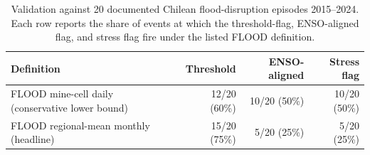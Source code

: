 \begin{table}[H]
\centering
\caption{Validation against 20 documented Chilean flood-disruption episodes 2015--2024. Each row reports the share of events at which the threshold-flag, ENSO-aligned flag, and stress flag fire under the listed FLOOD definition.}
\label{tab:validation}
\small
\begin{tabular}{lrrr}
\toprule
\textbf{Definition} & \textbf{Threshold} & \textbf{ENSO-aligned} & \textbf{Stress flag} \\
\midrule
FLOOD mine-cell daily (conservative lower bound) & 12/20 (60\%) & 10/20 (50\%) & 10/20 (50\%) \\
FLOOD regional-mean monthly (headline) & 15/20 (75\%) &  5/20 (25\%) &  5/20 (25\%) \\
\bottomrule
\end{tabular}
\end{table}

